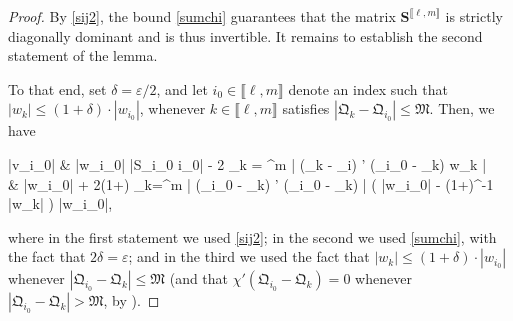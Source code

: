 \documentclass{amsart}
\numberwithin{equation}{section}
\theoremstyle{remark}
\theoremstyle{definition}
\begin{document}
	\begin{proof}
		
		By \eqref{sij2}, the bound \eqref{sumchi} guarantees that the matrix $\bm{S}^{\llbracket \ell, m \rrbracket}$ is strictly diagonally dominant and is thus invertible. It remains to establish the second statement of the lemma.
		
		 To that end, set $\delta = \varepsilon / 2$, and let $i_0 \in \llbracket \ell, m \rrbracket$ denote an index such that $|w_k| \le (1+\delta) \cdot |w_{i_0}|$, whenever $k \in \llbracket \ell, m \rrbracket$ satisfies $|\mathfrak{Q}_k - \mathfrak{Q}_{i_0}| \le \mathfrak{M}$. Then, we have 
		\begin{flalign}
			\label{vi0wk} 
			\begin{aligned} 
			|v_{i_0}| & \ge  |w_{i_0}| \cdot |S_{i_0 i_0}|  - 2 \displaystyle\sum_{k = \ell}^{m} |  (\Lambda_k - \Lambda_i) \cdot \chi' (_{i_0} - _k) \cdot w_k | \\ 
			& \ge \varepsilon |w_{i_0}| + 2(1+\delta) \displaystyle\sum_{k=\ell}^{m} |  (\Lambda_{i_0} - \Lambda_k) \cdot \chi' (_{i_0} - _k) | \cdot ( |w_{i_0}| - (1+\delta)^{-1} \cdot |w_k| ) \ge \varepsilon |w_{i_0}|,
			\end{aligned} 
		\end{flalign} 
		
		\noindent where in the first statement we used \eqref{sij2}; in the second we used \eqref{sumchi}, with the fact that $2 \delta = \varepsilon$; and in the third we used the fact that $|w_k| \le (1+\delta) \cdot |w_{i_0}|$ whenever $|\mathfrak{Q}_{i_0} - \mathfrak{Q}_k| \le \mathfrak{M}$ (and that $\chi' (\mathfrak{Q}_{i_0} - \mathfrak{Q}_k) = 0$ whenever $|\mathfrak{Q}_{i_0} - \mathfrak{Q}_k| > \mathfrak{M}$, by ).
		

\end{proof}
\end{document}
